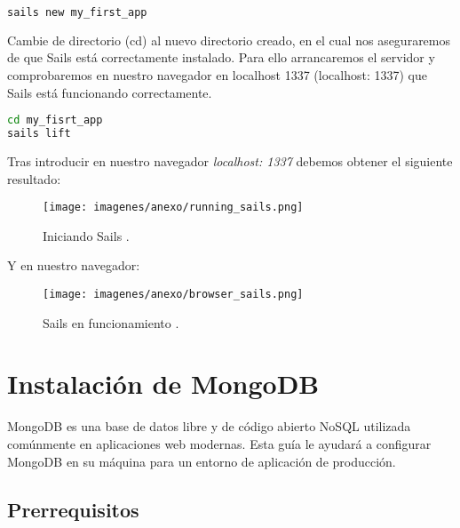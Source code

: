 \begin{lstlisting}[language=bash]
sails new my_first_app
\end{lstlisting}

Cambie de directorio (cd) al nuevo directorio creado, en el cual nos aseguraremos de que Sails está correctamente instalado. Para ello arrancaremos el servidor y comprobaremos en nuestro navegador en localhost 1337 (localhost: 1337) que Sails está funcionando correctamente.\\


\begin{lstlisting}[language=bash]
cd my_fisrt_app
sails lift
\end{lstlisting}


Tras introducir en nuestro navegador \emph{localhost: 1337} debemos obtener el siguiente resultado:


\begin{figure}[H]
  \begin{center}
    \texttt{[image: imagenes/anexo/running\_sails.png]}
  \end{center}
  \label{fig:logo}
 \caption{Iniciando Sails \protect\footnotemark.}
\end{figure}


Y en nuestro navegador:\\

\begin{figure}[H]
  \begin{center}
    \texttt{[image: imagenes/anexo/browser\_sails.png]}
  \end{center}
  \label{fig:logo}
 \caption{Sails en funcionamiento \protect\footnotemark.}
\end{figure}



\section{Instalación de MongoDB}

MongoDB es una base de datos libre y de código abierto NoSQL utilizada comúnmente en aplicaciones web modernas. Esta guía le ayudará a configurar MongoDB en su máquina para un entorno de aplicación de producción.\\

\subsection{Prerrequisitos}

